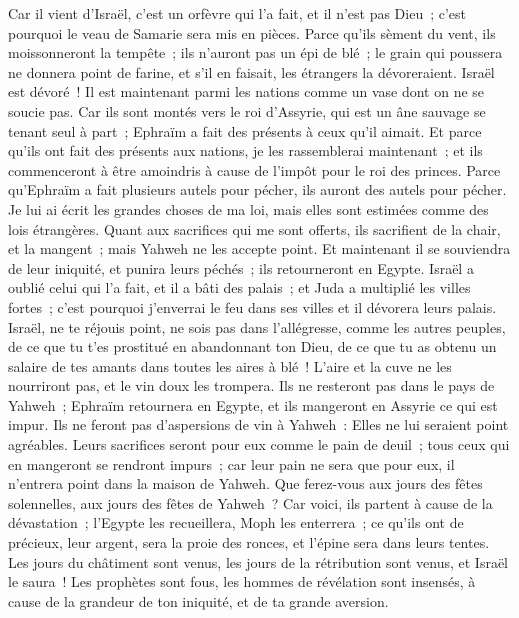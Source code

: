 \begin{multicols}{2}
Car il vient d'Israël, c'est un orfèvre qui l'a fait, et il n'est pas Dieu~; c'est pourquoi le veau de Samarie sera mis en pièces.
Parce qu'ils sèment du vent, ils moissonneront la tempête~; ils n'auront pas un épi de blé~; le grain qui poussera ne donnera point de farine, et s'il en faisait, les étrangers la dévoreraient.
Israël est dévoré~! Il est maintenant parmi les nations comme un vase dont on ne se soucie pas.
Car ils sont montés vers le roi d'Assyrie, qui est un âne sauvage se tenant seul à part~; Ephraïm a fait des présents à ceux qu'il aimait.
Et parce qu'ils ont fait des présents aux nations, je les rassemblerai maintenant~; et ils commenceront à être amoindris à cause de l'impôt pour le roi des princes.
Parce qu'Ephraïm a fait plusieurs autels pour pécher, ils auront des autels pour pécher.
Je lui ai écrit les grandes choses de ma loi, mais elles sont estimées comme des lois étrangères.
Quant aux sacrifices qui me sont offerts, ils sacrifient de la chair, et la mangent~; mais Yahweh ne les accepte point. Et maintenant il se souviendra de leur iniquité, et punira leurs péchés~; ils retourneront en Egypte.
Israël a oublié celui qui l'a fait, et il a bâti des palais~; et Juda a multiplié les villes fortes~; c'est pourquoi j'enverrai le feu dans ses villes et il dévorera leurs palais.
\VerseOne{}Israël, ne te réjouis point, ne sois pas dans l'allégresse, comme les autres peuples, de ce que tu t'es prostitué en abandonnant ton Dieu, de ce que tu as obtenu un salaire de tes amants dans toutes les aires à blé~!
L'aire et la cuve ne les nourriront pas, et le vin doux les trompera.
Ils ne resteront pas dans le pays de Yahweh~; Ephraïm retournera en Egypte, et ils mangeront en Assyrie ce qui est impur.
Ils ne feront pas d'aspersions de vin à Yahweh~: Elles ne lui seraient point agréables. Leurs sacrifices seront pour eux comme le pain de deuil~; tous ceux qui en mangeront se rendront impurs~; car leur pain ne sera que pour eux, il n'entrera point dans la maison de Yahweh.
Que ferez-vous aux jours des fêtes solennelles, aux jours des fêtes de Yahweh~?
Car voici, ils partent à cause de la dévastation~; l'Egypte les recueillera, Moph les enterrera~; ce qu'ils ont de précieux, leur argent, sera la proie des ronces, et l'épine sera dans leurs tentes.
Les jours du châtiment sont venus, les jours de la rétribution sont venus, et Israël le saura~! Les prophètes sont fous, les hommes de révélation sont insensés, à cause de la grandeur de ton iniquité, et de ta grande aversion.

\end{multicols}

